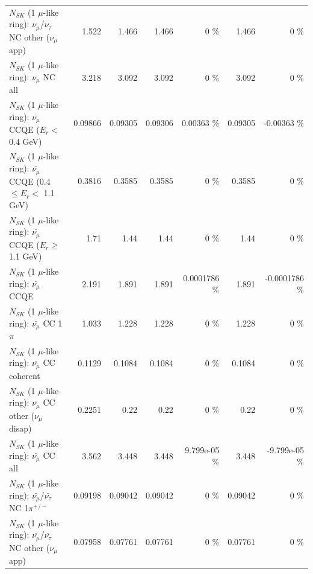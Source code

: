 \begin{table}
\begin{tabular}{| l | r | r | r  r | r  r |}
     $N_{SK}$ (1 $\mu$-like ring): $\nu_\mu$/$\nu_\tau$ NC other ($\nu_\mu$ app) &           1.522 &           1.466 &           1.466 &        0 \%  &           1.466 &        0 \%  \\ 
                                $N_{SK}$ (1 $\mu$-like ring): $\nu_{\mu}$ NC all &           3.218 &           3.092 &           3.092 &        0 \%  &           3.092 &        0 \%  \\ 
\hline
\hline
\hline
          $N_{SK}$ (1 $\mu$-like ring): $\bar{\nu_\mu}$ CCQE ($E_{r} <$ 0.4 GeV) &         0.09866 &         0.09305 &         0.09306 &  0.00363 \%  &         0.09305 & -0.00363 \%  \\ 
 $N_{SK}$ (1 $\mu$-like ring): $\bar{\nu_\mu}$ CCQE (0.4 $\leq E_{r} <$ 1.1 GeV) &          0.3816 &          0.3585 &          0.3585 &        0 \%  &          0.3585 &        0 \%  \\ 
       $N_{SK}$ (1 $\mu$-like ring): $\bar{\nu_\mu}$ CCQE ($E_{r} \geq$ 1.1 GeV) &            1.71 &            1.44 &            1.44 &        0 \%  &            1.44 &        0 \%  \\ 
\hline
                              $N_{SK}$ (1 $\mu$-like ring): $\bar{\nu_\mu}$ CCQE &           2.191 &           1.891 &           1.891 & 0.0001786 \%  &           1.891 & -0.0001786 \%  \\ 
                         $N_{SK}$ (1 $\mu$-like ring): $\bar{\nu_\mu}$ CC 1$\pi$ &           1.033 &           1.228 &           1.228 &        0 \%  &           1.228 &        0 \%  \\ 
                       $N_{SK}$ (1 $\mu$-like ring): $\bar{\nu_\mu}$ CC coherent &          0.1129 &          0.1084 &          0.1084 &        0 \%  &          0.1084 &        0 \%  \\ 
        $N_{SK}$ (1 $\mu$-like ring): $\bar{\nu_\mu}$ CC other ($\nu_\mu$ disap) &          0.2251 &            0.22 &            0.22 &        0 \%  &            0.22 &        0 \%  \\ 
                          $N_{SK}$ (1 $\mu$-like ring): $\bar{\nu_{\mu}}$ CC all &           3.562 &           3.448 &           3.448 & 9.799e-05 \%  &           3.448 & -9.799e-05 \%  \\ 
\hline
  $N_{SK}$ (1 $\mu$-like ring): $\bar{\nu_\mu}$/$\bar{\nu_\tau}$ NC 1$\pi^{+/-}$ &         0.09198 &         0.09042 &         0.09042 &        0 \%  &         0.09042 &        0 \%  \\ 
$N_{SK}$ (1 $\mu$-like ring): $\bar{\nu_\mu}$/$\bar{\nu_\tau}$ NC other ($\nu_\mu$ app) &         0.07958 &         0.07761 &         0.07761 &        0 \%  &         0.07761 &        0 \%  \\ 

\end{tabular}
\end{table}
